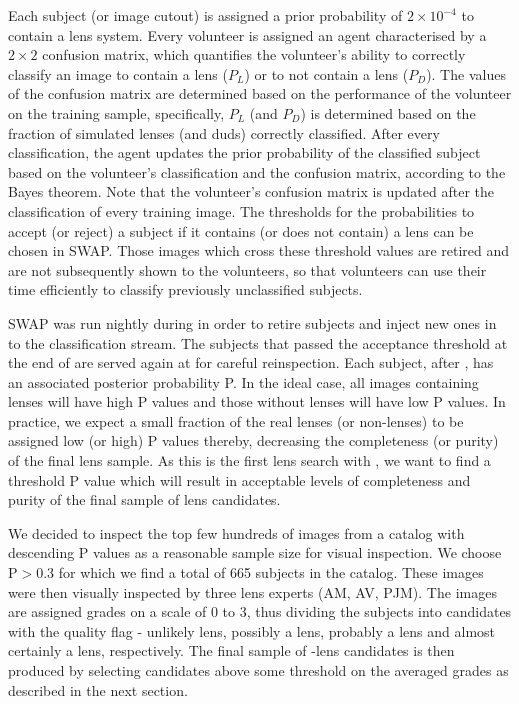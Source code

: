 \documentclass[useAMS,usenatbib,a4paper]{mn2e}
\begin{document}
Each subject (or image cutout) is assigned a prior probability of
$2\times10^{-4}$ to contain a lens system. Every volunteer 
is assigned an agent characterised by a $2\times2$ confusion matrix,
which quantifies the volunteer's ability to correctly classify an image
to contain a lens ($P_L$) or to not contain a lens ($P_D$). The values of
the confusion matrix are determined based on the performance of the
volunteer on the training sample, specifically, $P_L$ (and $P_D$) is
determined based on the fraction of simulated lenses (and duds)
correctly classified. After every classification, the agent updates the
prior probability of the classified subject based on the volunteer's classification
and the confusion matrix, according to the Bayes theorem.
Note that the volunteer's confusion matrix is updated after the
classification of every training image. The thresholds for the
probabilities to accept (or reject) a subject  if it contains (or does
not contain) a lens can be chosen in SWAP. Those images which cross
these threshold values are retired and are not subsequently shown to the
volunteers, so that volunteers can use their time efficiently to
classify previously unclassified subjects.

SWAP was run nightly during \StageOne in order to retire subjects and inject new
ones in to the classification stream. The subjects that passed the acceptance
threshold at the end of \StageOne are served again at \StageTwo for careful
reinspection. Each subject, after \StageTwo, has an associated posterior
probability P. In the ideal case, all images containing lenses will have high P
values and those without lenses will have low P values. In practice, we expect a
small fraction of the real lenses (or non-lenses) to be assigned low (or high) P
values thereby, decreasing the completeness (or purity) of the final lens
sample. As this is the first lens search with \sw, we want to find a
threshold P value which will result in acceptable levels of completeness and
purity of the final sample of lens candidates.

We decided to inspect the top few hundreds of images from a catalog with
descending P values as a reasonable sample size for visual inspection.
We choose P$>0.3$ for which we find a total of 665 subjects in the
catalog. These images were then visually inspected by three lens experts
(AM, AV, PJM).  The images are assigned grades on a scale of 0 to 3,
thus dividing the subjects into candidates with the quality flag -
unlikely lens, possibly a lens, probably a lens and almost certainly a
lens, respectively. The final sample of \sw-\cfhtls lens candidates is
then produced by selecting candidates above some threshold on the
averaged grades as described in the next section.
\end{document}
